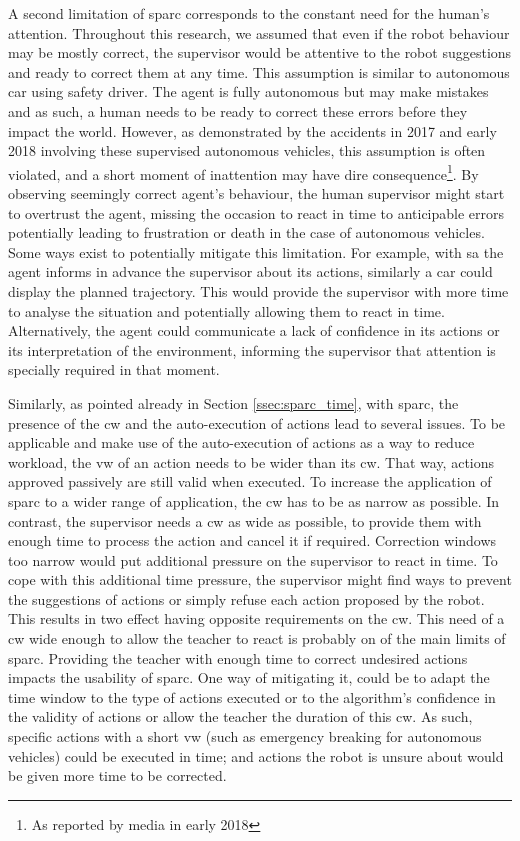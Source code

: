 A second limitation of \gls{sparc} corresponds to the constant need for the human's attention. Throughout this research, we assumed that even if the robot behaviour may be mostly correct, the supervisor would be attentive to the robot suggestions and ready to correct them at any time. This assumption is similar to autonomous car using safety driver. The agent is fully autonomous but may make mistakes and as such, a human needs to be ready to correct these errors before they impact the world. However, as demonstrated by the accidents in 2017 and early 2018 involving these supervised autonomous vehicles, this assumption is often violated, and a short moment of inattention may have dire consequence\footnote{As reported by media in early 2018}. By observing seemingly correct agent's behaviour, the human supervisor might start to overtrust the agent, missing the occasion to react in time to anticipable errors potentially leading to frustration or death in the case of autonomous vehicles. Some ways exist to potentially mitigate this limitation. For example, with \gls{sa} the agent informs in advance the supervisor about its actions, similarly a car could display the planned trajectory. This would provide the supervisor with more time to analyse the situation and potentially allowing them to react in time. Alternatively, the agent could communicate a lack of confidence in its actions or its interpretation of the environment, informing the supervisor that attention is specially required in that moment.

Similarly, as pointed already in Section \ref{ssec:sparc_time}, with \gls{sparc}, the presence of the \gls{cw} and the auto-execution of actions lead to several issues. To be applicable and make use of the auto-execution of actions as a way to reduce workload, the \gls{vw} of an action needs to be wider than its \gls{cw}. That way, actions approved passively are still valid when executed. To increase the application of \gls{sparc} to a wider range of application, the \gls{cw} has to be as narrow as possible. In contrast, the supervisor needs a \gls{cw} as wide as possible, to provide them with enough time to process the action and cancel it if required. Correction windows too narrow would put additional pressure on the supervisor to react in time. To cope with this additional time pressure, the supervisor might find ways to prevent the suggestions of actions or simply refuse each action proposed by the robot. This results in two effect having opposite requirements on the \gls{cw}. This need of a \gls{cw} wide enough to allow the teacher to react is probably on of the main limits of \gls{sparc}. Providing the teacher with enough time to correct undesired actions impacts the usability of \gls{sparc}. One way of mitigating it, could be to adapt the time window to the type of actions executed or to the algorithm's confidence in the validity of actions or allow the teacher the duration of this \gls{cw}. As such, specific actions with a short \gls{vw} (such as emergency breaking for autonomous vehicles) could be executed in time; and actions the robot is unsure about would be given more time to be corrected. 

